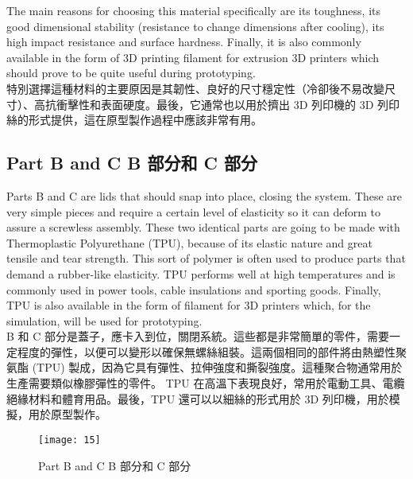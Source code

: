 \fontsize{14pt}{2.5pt}\sectionef 
{The main reasons for choosing this material specifically are its toughness, its good dimensional stability (resistance to change dimensions after cooling), its high impact resistance and surface hardness. Finally, it is also commonly available in the form of 3D printing filament for extrusion 3D printers which should prove to be quite useful during prototyping.}\\[15pt]

\fontsize{14pt}{5pt}\sectionef
 {特別選擇這種材料的主要原因是其韌性、良好的尺寸穩定性（冷卻後不易改變尺寸）、高抗衝擊性和表面硬度。最後，它通常也以用於擠出 3D 列印機的 3D 列印絲的形式提供，這在原型製作過程中應該非常有用。}\\[15pt]
\newpage

\subsection{Part B and C     B 部分和 C 部分}

\fontsize{14pt}{2.5pt}\sectionef 
{Parts B and C are lids that should snap into place, closing the system. These are very simple pieces and require a certain level of elasticity so it can deform to assure a screwless assembly. These two identical parts are going to be made with Thermoplastic Polyurethane (TPU), because of its elastic nature and great tensile and tear strength. This sort of polymer is often used to produce parts that demand a rubber-like elasticity. TPU performs well at high temperatures and is commonly used in power tools, cable insulations and sporting goods. Finally, TPU is also available in the form of filament for 3D printers which, for the simulation, will be used for prototyping.}\\[15pt]

\fontsize{14pt}{5pt}\sectionef
 {B 和 C 部分是蓋子，應卡入到位，關閉系統。這些都是非常簡單的零件，需要一定程度的彈性，以便可以變形以確保無螺絲組裝。這兩個相同的部件將由熱塑性聚氨酯 (TPU) 製成，因為它具有彈性、拉伸強度和撕裂強度。這種聚合物通常用於生產需要類似橡膠彈性的零件。 TPU 在高溫下表現良好，常用於電動工具、電纜絕緣材料和體育用品。最後，TPU 還可以以細絲的形式用於 3D 列印機，用於模擬，用於原型製作。}\\[15pt]

\begin{figure}[hbt!]
\begin{center}
\texttt{[image: 15]}
\caption{\Large Part B and C     B 部分和 C 部分}\label{fig.15}
\end{center}
\end{figure}

